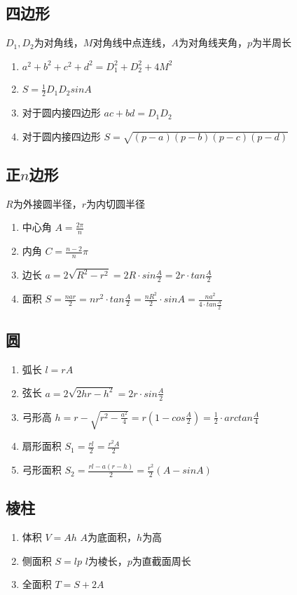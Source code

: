 	\subsection{四边形}
		$D_1, D_2$为对角线，$M$对角线中点连线，$A$为对角线夹角，$p$为半周长
		\begin{enumerate}\setlength{\itemsep}{-\itemsep}
			\item $a^2+b^2+c^2+d^2=D_1^2+D_2^2+4M^2$
			\item $S=\frac{1}{2}D_1D_2sinA$
			\item 对于圆内接四边形
				$ac+bd=D_1D_2$
			\item 对于圆内接四边形
				$S=\sqrt{(p-a)(p-b)(p-c)(p-d)}$
		\end{enumerate}
	\subsection{正$n$边形}
		$R$为外接圆半径，$r$为内切圆半径
		\begin{enumerate}\setlength{\itemsep}{-\itemsep}
			\item 中心角
				$A=\frac{2\pi}{n}$
			\item 内角
				$C=\frac{n-2}{n}\pi$
			\item 边长
				$a=2\sqrt{R^2-r^2}=2R \cdot sin\frac{A}{2}=2r \cdot tan\frac{A}{2}$
			\item 面积
				$S=\frac{nar}{2}=nr^2 \cdot tan\frac{A}{2}=\frac{nR^2}{2} \cdot sinA=\frac{na^2}{4 \cdot tan\frac{A}{2}}$
		\end{enumerate}
	\subsection{圆}
		\begin{enumerate}\setlength{\itemsep}{-\itemsep}
			\item 弧长
				$l=rA$
			\item 弦长
				$a=2\sqrt{2hr-h^2}=2r\cdot sin\frac{A}{2}$
			\item 弓形高
				$h=r-\sqrt{r^2-\frac{a^2}{4}}=r(1-cos\frac{A}{2})=\frac{1}{2} \cdot arctan\frac{A}{4}$
			\item 扇形面积
				$S_1=\frac{rl}{2}=\frac{r^2A}{2}$
			\item 弓形面积
				$S_2=\frac{rl-a(r-h)}{2}=\frac{r^2}{2}(A-sinA)$
		\end{enumerate}
	\subsection{棱柱}
		\begin{enumerate}\setlength{\itemsep}{-\itemsep}
			\item 体积
				$V=Ah$
				$A$为底面积，$h$为高
			\item 侧面积
				$S=lp$
				$l$为棱长，$p$为直截面周长
			\item 全面积
				$T=S+2A$
		\end{enumerate}
